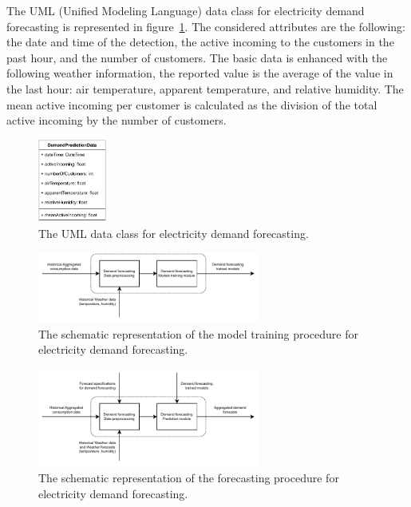 The UML (Unified Modeling Language) data class for electricity demand forecasting is represented in figure~\ref{fig:umldemand}.
The considered attributes are the following: the date and time of the detection, the active incoming to the customers in the past hour, and the number of customers.
The basic data is enhanced with the following weather information, the reported value is the average of the value in the last hour: air temperature, apparent temperature, and relative humidity.
The mean active incoming per customer is calculated as the division of the total active incoming by the number of customers.

\begin{figure}[H]
\centering
\includegraphics[width=0.20\textwidth]{images/demand_prediction_uml}
\caption{The UML data class for electricity demand forecasting.}
\label{fig:umldemand}
\end{figure}

\begin{figure}[H]
\centering
\includegraphics[width=0.65\textwidth]{images/system_model_training_demand}
\caption{The schematic representation of the model training procedure for electricity demand forecasting.}
\label{fig:modeltrainingdemand}
\end{figure}

\begin{figure}[H]
\centering
\includegraphics[width=0.65\textwidth]{images/system_model_forecasting_demand}
\caption{The schematic representation of the forecasting procedure for electricity demand forecasting.}
\label{fig:modelforecastingdemand}
\end{figure}

